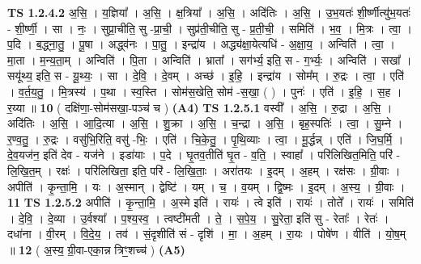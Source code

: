 \documentclass[17pt]{extarticle}
\begin{document}
                  \newline
                                \textbf{ TS 1.2.4.2} \newline
                  अ॒सि॒ । य॒ज्ञिया᳚ । अ॒सि॒ । क्ष॒त्रिया᳚ । अ॒सि॒ । अदि॑तिः । अ॒सि॒ । उ॒भ॒यतः॑ शी॒र्ष्णीत्यु॑भ॒यतः॑ - शी॒र्ष्णी॒ । सा । नः॒ । सुप्रा॒चीति॒ सु -प्रा॒ची॒ । सुप्र॑ती॒चीति॒ सु - प्र॒ती॒ची॒ । समिति॑ । भ॒व॒ । मि॒त्रः । त्वा॒ । प॒दि । ब॒द्ध्ना॒तु॒ । पू॒षा । अद्ध्व॑नः । पा॒तु॒ । इन्द्रा॑य । अद्ध्य॑क्षा॒येत्यधि॑ - अ॒क्षा॒य॒ । अन्विति॑ । त्वा॒ । मा॒ता । म॒न्य॒ता॒म् । अन्विति॑ । पि॒ता । अन्विति॑ । भ्राता᳚ । सग॑र्भ्य॒ इति॒ स - ग॒र्भ्यः॒ । अन्विति॑ । सखा᳚ । सयू॑थ्य॒ इति॒ स - यू॒थ्यः॒ । सा । दे॒वि॒ । दे॒वम् । अच्छ॑ । इ॒हि॒ । इन्द्रा॑य । सोम᳚म् । रु॒द्रः । त्वा॒ । एति॑ । व॒र्त॒य॒तु॒ । मि॒त्रस्य॑ । प॒था । स्व॒स्ति । सोम॑स॒खेति॒ सोम॑ -स॒खा॒ ( ) । पुनः॑ । एति॑ । इ॒हि॒ । स॒ह । र॒य्या ॥ \textbf{  10} \newline
                  \newline
                      ( दक्षि॑णा॒-सोम॑सखा॒-पञ्च॑ च )  \textbf{(A4)} \newline \newline
                                \textbf{ TS 1.2.5.1} \newline
                  वस्वी᳚ । अ॒सि॒ । रु॒द्रा । अ॒सि॒ । अदि॑तिः । अ॒सि॒ । आ॒दि॒त्या । अ॒सि॒ । शु॒क्रा । अ॒सि॒ । च॒न्द्रा । अ॒सि॒ । बृह॒स्पतिः॑ । त्वा॒ । सु॒म्ने । र॒ण्व॒तु॒ । रु॒द्रः । वसु॑भि॒रिति॒ वसु॑ -भिः॒ । एति॑ । चि॒के॒तु॒ । पृ॒थि॒व्याः । त्वा॒ । मू॒र्द्धन्न् । एति॑ । जि॒घ॒र्मि॒ । दे॒व॒यज॑न॒ इति॑ देव - यज॑ने । इडा॑याः । प॒दे । घृ॒तव॒तीति॑ घृ॒त - व॒ति॒ । स्वाहा᳚ । परि॑लिखित॒मिति॒ परि॑ - लि॒खि॒त॒म् । रक्षः॑ । परि॑लिखिता॒ इति॒ परि॑ - लि॒खि॒ताः॒ । अरा॑तयः । इ॒दम् । अ॒हम् । रक्ष॑सः । ग्री॒वाः । अपीति॑ । कृ॒न्ता॒मि॒ । यः । अ॒स्मान् । द्वेष्टि॑ । यम् । च॒ । व॒यम् । द्वि॒ष्मः । इ॒दम् । अ॒स्य॒ । ग्री॒वाः । \textbf{  11} \newline
                  \newline
                                \textbf{ TS 1.2.5.2} \newline
                  अपीति॑ । कृ॒न्ता॒मि॒ । अ॒स्मे इति॑ । रायः॑ । त्वे इति॑ । रायः॑ । तोते᳚ । रायः॑ । समिति॑ । दे॒वि॒ । दे॒व्या । उ॒र्वश्या᳚ । प॒श्य॒स्व॒ । त्वष्टी॑मती । ते॒ । स॒पे॒य॒ । सु॒रेता॒ इति॑ सु - रेताः᳚ । रेतः॑ । दधा॑ना । वी॒रम् । वि॒दे॒य॒ । तव॑ । सं॒दृशीति॑ सं - दृशि॑ । मा॒ । अ॒हम् । रा॒यः । पोषे॑ण । वीति॑ । यो॒ष॒म् ॥ \textbf{  12} \newline
                  \newline
                      ( अ॒स्य॒ ग्री॒वा-एका॒न्न त्रिꣳ॒॒शच्च॑ )  \textbf{(A5)} \newline \newline
\end{document}
